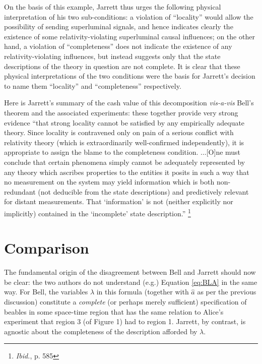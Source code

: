 \documentclass[12pt]{article}
\begin{document}
On the basis of this example, 
Jarrett thus urges the following physical interpretation of
his two sub-conditions:  a violation of ``locality'' would allow the
possibility of sending superluminal signals, and hence indicates
clearly the existence of some relativity-violating superluminal causal
influences; on the other hand, a violation of ``completeness'' does
not indicate the existence of any relativity-violating influences, but
instead suggests only that the state descriptions of the theory in
question are not complete.  It is clear that these physical
interpretations of the two conditions were the basis for Jarrett's
decision to name them ``locality'' and ``completeness'' respectively.  

Here is Jarrett's summary of the cash value of this decomposition
\emph{vis-a-vis} Bell's theorem and the associated experiments:  these
together provide very strong evidence ``that
strong locality cannot be satisfied by any empirically adequate
theory.  Since locality is contravened only on pain of a serious
conflict with relativity theory (which is extraordinarily
well-confirmed independently), it is appropriate to assign the blame
to the completeness condition.  ...[O]ne must conclude that certain
phenomena simply cannot be adequately represented by any theory which
ascribes properties to the entities it posits in such a way that no
measurement on the system may yield information which is both
non-redundant (not deducible from the state descriptions) and
predictively relevant for distant measurements.  That `information' is
not (neither explicitly nor implicitly) contained in the `incomplete'
state description.''  \footnote{\emph{Ibid.}, p. 585}


\section{Comparison}

The fundamental origin of the disagreement between Bell and Jarrett
should now be clear:  the two authors do not understand (e.g.)
Equation \ref{eq:BLA} in the same way.  For Bell, the variables
$\lambda$ in this formula (together with $\hat{a}$ as per the previous 
discussion) constitute a \emph{complete} (or perhaps merely
sufficient) specification of beables in some
space-time region that has the same relation to Alice's experiment  
that region 3 (of Figure 1) had to region 1.  Jarrett, by contrast,
is agnostic about the completeness of the description afforded by
$\lambda$.  
\end{document}

